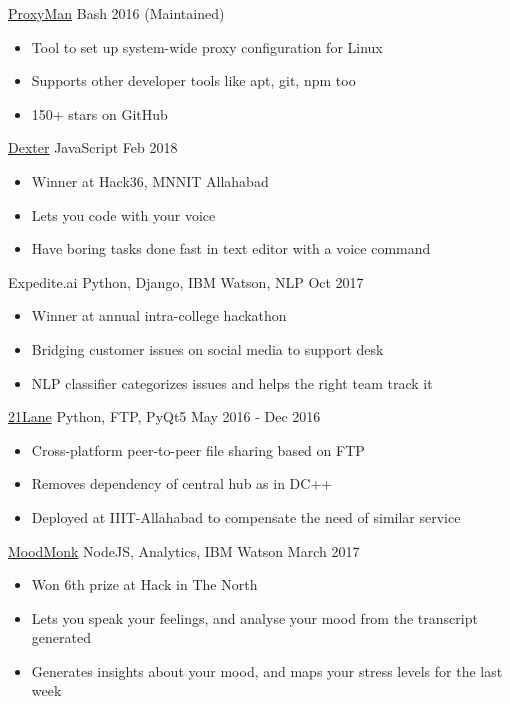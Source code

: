 \documentclass[10pt,a4paper]{altacv}
\begin{document}
\cvproject
    {\href{https://github.com/himanshub16/ProxyMan/}{ProxyMan}}
    {Bash}
    {2016 (Maintained)}
\begin{itemize}
	\item {Tool to set up system-wide proxy configuration for Linux}
    \item {Supports other developer tools like apt, git, npm too}
    \item {150+ stars on GitHub}
\end{itemize}

\divider

\cvproject
    {\href{https://github.com/himanshub16/dexter/}{Dexter}}
    {JavaScript}
    {Feb 2018}
\begin{itemize}
    \item {Winner at Hack36, MNNIT Allahabad}
	\item {Lets you code with your voice}
    \item {Have boring tasks done fast in text editor with a voice command}
\end{itemize}

\divider

\cvproject
    {Expedite.ai}
    {Python, Django, IBM Watson, NLP}
    {Oct 2017}
\begin{itemize}
	\item {Winner at annual intra-college hackathon}
    \item {Bridging customer issues on social media to support desk}
    \item {NLP classifier categorizes issues and helps the right team track it}
\end{itemize}

\divider

\cvproject
	{\href{https://github.com/himanshub16/21Lane/}{21Lane}}
    {Python, FTP, PyQt5}
    {May 2016 - Dec 2016}  
\begin{itemize}
	\item {Cross-platform peer-to-peer file sharing based on FTP}
    \item {Removes dependency of central hub as in DC++}
    \item {Deployed at IIIT-Allahabad to compensate the need of similar service}
\end{itemize}

\divider

\cvproject
    {\href{https://github.com/himanshub16/moodmonk}{MoodMonk}}
    {NodeJS, Analytics, IBM Watson}
    {March 2017}
\begin{itemize}
	\item {Won 6th prize at Hack in The North}
    \item {Lets you speak your feelings, and analyse your mood from the transcript generated}
    \item {Generates insights about your mood, and maps your stress levels for the last week}
\end{itemize}
\end{document}
